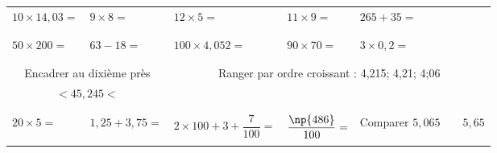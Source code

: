 \documentclass[14]{article}
\begin{document}
    \begin{tabular}{p{3cm}|p{3cm}|p{3cm}|p{3cm}|p{3cm}}
         $10\times14,03=$ & $9\times8=$ & $12\times 5 = $ & $11\times9=$ & $265+35=$\\ 
         
         & & & &\\ \hline & & & &\\
         
         $50\times 200=$ & $63-18=$ & $100\times4,052=$ &  $90\times70=$ & $3\times0,2=$\\
         
         & & & &\\ \hline \multicolumn{2}{c|}{} & \multicolumn{2}{c}{}\\
         
         \multicolumn{2}{c|}{Encadrer au dixième près} & 
         \multicolumn{3}{c}{Ranger par ordre croissant : 4,215; 4,21; 4;06 }\\[2ex]
         
         \multicolumn{2}{c|}{$ \quad \quad < 45,245 < \quad \quad $} & 
         \multicolumn{3}{c}{}\\

        \multicolumn{2}{c|}{} & \multicolumn{2}{c}{} \\ \hline & & & &\\

        $20 \times 5=$ & $1,25+3,75=$ & $2\times100+3+\dfrac{7}{100}=$ & $ \dfrac{\np{486}}{100}=$ & Comparer $5,065 \quad\quad  5,65$ \\

        & & & &\\ 
    \end{tabular}
\end{document}
